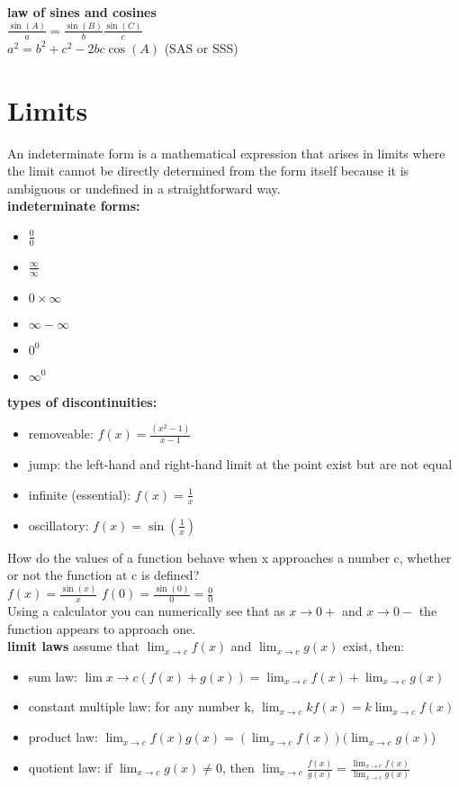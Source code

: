\documentclass{article}
\begin{document}
\textbf{law of sines and cosines}\\

	$\frac{\sin(A)}{a} = \frac{\sin(B)}{b} \frac{\sin(C)}{c}$\\

	$a^2 = b^2 + c^2 - 2bc\cos(A)$ (SAS or SSS)

\section*{Limits}

An indeterminate form is a mathematical expression that arises in limits where the limit cannot be directly determined from the form itself because it is ambiguous or undefined in a straightforward way.\\

\textbf{indeterminate forms:}
	\begin{itemize}
		\item $\frac{0}{0}$
		\item $\frac{\infty}{\infty}$
		\item $0 \times \infty$
		\item $\infty - \infty$
		\item $0^0$
		\item $\infty^0$
	\end{itemize}

\textbf{types of discontinuities:}
	\begin{itemize}
		\item removeable: $f(x) = \frac{(x^2 - 1)}{x - 1}$
		\item jump: the left-hand and right-hand limit at the point exist but are not equal
		\item infinite (essential): $f(x) = \frac{1}{x}$
		\item oscillatory: $f(x) = \sin(\frac{1}{x})$
	\end{itemize}

How do the values of a function behave when x approaches a number c, whether or not the function at c is defined?\\
$f(x) = \frac{\sin(x)}{x}$
$f(0) = \frac{\sin(0)}{0} = \frac{0}{0}$\\
Using a calculator you can numerically see that as $x \to 0+$ and $x \to 0-$ the function appears to approach one.\\

\textbf{limit laws} assume that $\lim_{x \to c}f(x)$ and $\lim_{x \to c}g(x)$ exist, then:
	\begin{itemize}
		\item sum law: $\lim{x \to c}(f(x) + g(x)) = \lim_{x \to c}f(x) + \lim_{x \to c}g(x)$
		\item constant multiple law: for any number k, $\lim_{x \to c}kf(x) = k\lim_{x \to c}f(x)$
		\item product law: $\lim_{x \to c}f(x)g(x) = (\lim_{x \to c}f(x))(\lim_{x \to c}g(x)$)
		\item quotient law: if $\lim_{x \to c}g(x) \neq 0$, then $\lim_{x \to c}\frac{f(x)}{g(x)} = \frac{\lim_{x \to c}f(x)}{\lim_{x \to c}g(x)}$
	\end{itemize}
\end{document}
